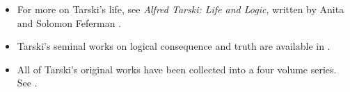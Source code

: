 \documentclass[../../../include/open-logic-section]{subfiles}
\begin{document}

\begin{itemize} 
\item For more on Tarski's life, see \emph{Alfred Tarski: Life and Logic}, written by
 Anita and Solomon Feferman \citep{feferman2004}. 

\item Tarski's seminal works on logical consequence and truth are available in 
\citet{tarski1983}.

\item All of Tarski's original works have been collected into a four volume series.
See \citep{Tarski1981}. 
\end{itemize}
\end{document}
